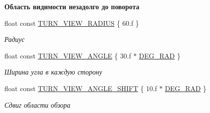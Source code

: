 \begin{Indent}\textbf{ Область видимости незадолго до поворота}\par
\begin{DoxyCompactItemize}
\item 
\mbox{\label{namespacertm_ae00afb2f4895bee23fd6b18359aa0923}} 
float const \hyperlink{namespacertm_ae00afb2f4895bee23fd6b18359aa0923}{T\+U\+R\+N\+\_\+\+V\+I\+E\+W\+\_\+\+R\+A\+D\+I\+US} \{ 60.f \}
\begin{DoxyCompactList}\small\item\em Радиус \end{DoxyCompactList}\item 
\mbox{\label{namespacertm_a2bed018eeea8988507e7a65059a3ff98}} 
float const \hyperlink{namespacertm_a2bed018eeea8988507e7a65059a3ff98}{T\+U\+R\+N\+\_\+\+V\+I\+E\+W\+\_\+\+A\+N\+G\+LE} \{ 30.f $\ast$ \hyperlink{namespacertm_a797faf3037681ed7bc153db9eca6155e}{D\+E\+G\+\_\+\+R\+AD} \}
\begin{DoxyCompactList}\small\item\em Ширина угла в каждую сторону \end{DoxyCompactList}\item 
\mbox{\label{namespacertm_ae725fc045c1a7417fa006a279e675deb}} 
float const \hyperlink{namespacertm_ae725fc045c1a7417fa006a279e675deb}{T\+U\+R\+N\+\_\+\+V\+I\+E\+W\+\_\+\+A\+N\+G\+L\+E\+\_\+\+S\+H\+I\+FT} \{ 10.f $\ast$ \hyperlink{namespacertm_a797faf3037681ed7bc153db9eca6155e}{D\+E\+G\+\_\+\+R\+AD} \}
\begin{DoxyCompactList}\small\item\em Сдвиг области обзора \end{DoxyCompactList}\end{DoxyCompactItemize}
\end{Indent}
